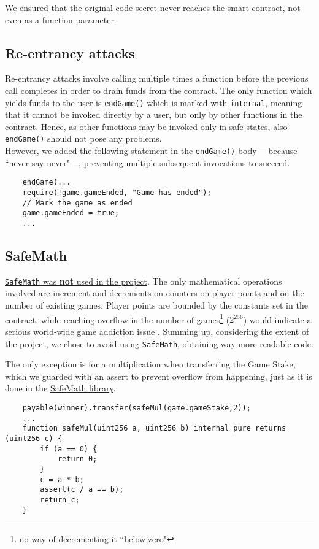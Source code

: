 We ensured that the original code secret never reaches the smart contract, not even as a function parameter.

\subsection{Re-entrancy attacks}
Re-entrancy attacks involve calling multiple times a function before the previous call completes in order to drain funds from the contract.
The only function which yields funds to the user is \texttt{endGame()} which is marked with \texttt{internal}, meaning that it cannot be invoked directly by a user, but only by other functions in the contract.
Hence, as other functions may be invoked only in safe states, also \texttt{endGame()} should not pose any problems.\\
However, we added the following statement in the \texttt{endGame()} body ---because ``never say never"---, preventing multiple subsequent invocations to succeed.
\begin{lstlisting}
    endGame(...
    require(!game.gameEnded, "Game has ended");
    // Mark the game as ended
    game.gameEnded = true;
    ...
\end{lstlisting}


\subsection{SafeMath}
\ul{\texttt{SafeMath} was \textbf{not} used in the project}.
The only mathematical operations involved are increment and decrements on counters on player points and on the number of existing games.
Player points are bounded by the constants set in the contract, while reaching overflow in the number of games\footnote{no way of decrementing it ``below zero"} ($2^{256}$) would indicate a serious world-wide game addiction issue \smiley.
Summing up, considering the extent of the project, we chose to avoid using \texttt{SafeMath}, obtaining way more readable code.

The only exception is for a multiplication when transferring the Game Stake, which we guarded with an assert to prevent overflow from happening, just as it is done in the \href{https://github.com/ConsenSysMesh/openzeppelin-solidity/blob/master/contracts/math/SafeMath.sol}{SafeMath library}.
\begin{lstlisting}
    payable(winner).transfer(safeMul(game.gameStake,2));
    ...
    function safeMul(uint256 a, uint256 b) internal pure returns (uint256 c) {
        if (a == 0) {
            return 0;
        }
        c = a * b;
        assert(c / a == b);
        return c;
    }
\end{lstlisting}